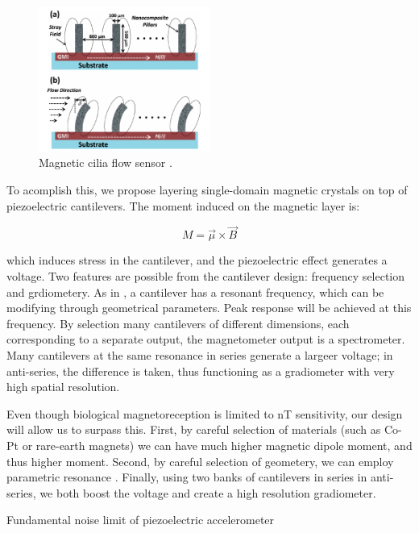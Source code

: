 \begin{figure}[h]
\centering
\includegraphics[width=0.5\textwidth]{cilia}
\caption{Magnetic cilia flow sensor \cite{alfadhel2014magnetic}.}
\label{fig:cilia}
\end{figure}

To acomplish this, we propose layering single-domain magnetic crystals on top of piezoelectric cantilevers. The moment induced on the magnetic layer is:

\begin{equation}
  M=\vec{\mu} \times \vec{B}
\end{equation}

which induces stress in the cantilever, and the piezoelectric effect generates a voltage. Two features are possible from the cantilever design: frequency selection and grdiometery. As in \cite{shen2008design}, a cantilever has a resonant frequency, which can be modifying through geometrical parameters. Peak response will be achieved at this frequency. By selection many cantilevers of different dimensions, each corresponding to a separate output, the magnetometer output is a spectrometer. Many cantilevers at the same resonance in series generate a largeer voltage; in anti-series, the difference is taken, thus functioning as a gradiometer with very high spatial resolution. 

Even though biological magnetoreception is limited to nT sensitivity, our design will allow us to surpass this. First, by careful selection of materials (such as Co-Pt or rare-earth magnets) \cite{coey2010magnetism, arnold2009permanent} we can have much higher magnetic dipole moment, and thus higher moment. Second, by careful selection of geometery, we can employ parametric resonance \cite{van2006resonant}. Finally, using two banks of cantilevers in series in anti-series, we both boost the voltage and create a high resolution gradiometer.


\cite{levinzon2004fundamental} Fundamental noise limit of piezoelectric accelerometer

